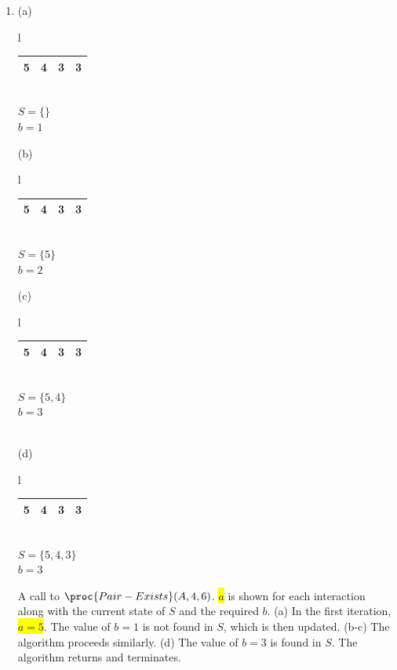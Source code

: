 \documentclass[a4paper]{exam}
\begin{document}
\begin{questions}
\begin{parts}
\begin{solution}
\begin{enumerate}
    \item       (a)
      \begin{tabular}{l}
      \begin{tabular}{|*4{c|}}
        \hline
        \cellcolor{yellow}5&4&3&3\\\hline
      \end{tabular}\\
        $S = \{\}$\\
        \colorbox{red!50}{$b = 1$}
      \end{tabular}
      (b)
      \begin{tabular}{l}
      \begin{tabular}{|*4{c|}}
        \hline
        5&\cellcolor{yellow}4&3&3\\\hline
      \end{tabular}\\
        $S = \{5\}$\\
        \colorbox{red!50}{$b = 2$}
      \end{tabular}
      (c)
      \begin{tabular}{l}
      \begin{tabular}{|*4{c|}}
        \hline
        5&4&\cellcolor{yellow}3&3\\\hline
      \end{tabular}\\
        $S = \{5,4\}$\\
        \colorbox{red!50}{$b = 3$}
      \end{tabular}\\
      (d)
      \begin{tabular}{l}
      \begin{tabular}{|*4{c|}}
        \hline
        5&4&3&\cellcolor{yellow}3\\\hline
      \end{tabular}\\
        $S = \{5,4,3\}$\\
        \colorbox{green!50}{$b = 3$}
      \end{tabular}

      A call to $\proc{Pair-Exists}(A, 4, 6)$. \colorbox{yellow}{$a$} is shown for each interaction along with the current state of $S$ and the required $b$. (a) In the first iteration, \colorbox{yellow}{$a=5$}. The value of \colorbox{red!50}{$b=1$} is not found in $S$, which is then updated. (b-c) The algorithm proceeds similarly. (d) The value of \colorbox{green!50}{$b=3$} is found in $S$. The algorithm returns  and terminates.


\end{enumerate}
\end{solution}
\end{parts}
\end{questions}
\end{document}
